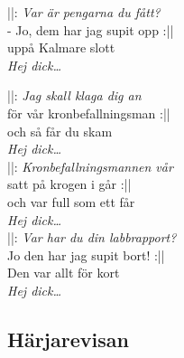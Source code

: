 \noindent ||: \textit{Var är pengarna du fått?}\\
\noindent - Jo, dem har jag supit opp :||\\
\noindent uppå Kalmare slott\\
\noindent \textit{Hej dick…}\\


\newpage

\noindent ||: \textit{Jag skall klaga dig an}\\
\noindent för vår kronbefallningsman :||\\
\noindent och så får du skam\\
\noindent \textit{Hej dick…}\\

\noindent ||: \textit{Kronbefallningsmannen vår}\\
\noindent satt på krogen i går :||\\
\noindent och var full som ett får\\
\noindent \textit{Hej dick…}\\

\noindent ||: \textit{Var har du din labbrapport?}\\
\noindent Jo den har jag supit bort! :||\\
\noindent Den var allt för kort\\
\noindent \textit{Hej dick…}\\


\newpage

\subsection*{Härjarevisan} 

